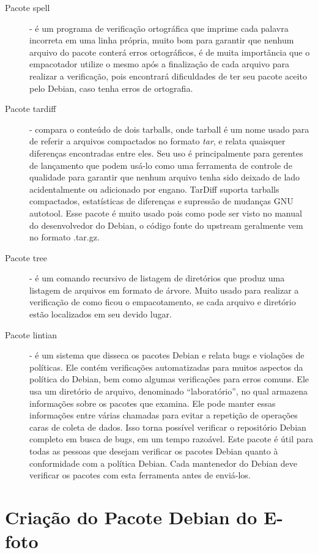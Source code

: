 \begin{description}
	\item[Pacote spell] - é um programa de verificação ortográfica que imprime cada palavra incorreta em uma linha própria, muito bom para garantir que nenhum arquivo do pacote conterá erros ortográficos, é de muita importância que o empacotador utilize o mesmo após a finalização de cada arquivo para realizar a verificação, pois encontrará dificuldades de ter seu pacote aceito pelo Debian, caso tenha erros de ortografia.
	\item[Pacote tardiff] - compara o conteúdo de dois tarballs, onde tarball é um nome usado para de referir a arquivos compactados no formato \textit{tar}, e relata quaisquer diferenças encontradas entre eles. Seu uso é principalmente para gerentes de lançamento que podem usá-lo como uma ferramenta de controle de qualidade para garantir que nenhum arquivo tenha sido deixado de lado acidentalmente ou adicionado por engano. TarDiff suporta tarballs compactados, estatísticas de diferenças e supressão de mudanças GNU autotool. Esse pacote é muito usado pois como pode ser visto no manual do desenvolvedor do Debian, o código fonte do upstream geralmente vem no formato .tar.gz.
	\item[Pacote tree] - é um comando recursivo de listagem de diretórios que produz uma listagem de arquivos em formato de árvore. Muito usado para realizar a verificação de como ficou o empacotamento, se cada arquivo e diretório estão localizados em seu devido lugar.
	\item[Pacote lintian] - é um sistema que disseca os pacotes Debian e relata bugs e violações de políticas. Ele contém verificações automatizadas para muitos aspectos da política do Debian, bem como algumas verificações para erros comuns. Ele usa um diretório de arquivo, denominado “laboratório”, no qual armazena informações sobre os pacotes que examina. Ele pode manter essas informações entre várias chamadas para evitar a repetição de operações caras de coleta de dados. Isso torna possível verificar o repositório Debian completo em busca de bugs, em um tempo razoável. Este pacote é útil para todas as pessoas que desejam verificar os pacotes Debian quanto à conformidade com a política Debian. Cada mantenedor do Debian deve verificar os pacotes com esta ferramenta antes de enviá-los.
\end{description}
 
\section{Criação do Pacote Debian do E-foto}

